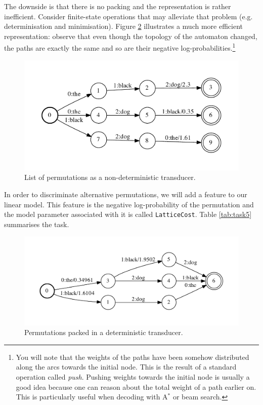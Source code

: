 The downside is that there is no packing and the representation is rather inefficient.
Consider finite-state operations that may alleviate that problem (e.g. determinisation and  minimisation). Figure \ref{fig:pi-det-min} illustrates a much more efficient representation: observe that even though the topology of the automaton changed, the paths are exactly the same and so are their negative log-probabilities.\footnote{You will note that the weights of the paths have been somehow distributed along the arcs towards the initial node. This is the result of a standard operation called \emph{push}. Pushing weights towards the initial node is usually a good idea because one can reason about the total weight of a path earlier on. This is particularly useful when decoding with A$^*$ or beam search.}

\begin{figure}[h]\centering
\includegraphics[scale=0.5]{permutations-list.pdf}
\caption{\label{fig:permutations}List of permutations as a non-deterministic transducer.}
\end{figure}


In order to discriminate alternative permutations, we will add a feature to our linear model. 
This feature is the negative log-probability of the permutation and the model parameter associated with it is called \texttt{LatticeCost}.
Table \ref{tab:task5} summarises the task. 

\begin{figure}[h]\centering
\includegraphics[scale=0.5]{permutations-lattice.pdf}
\caption{\label{fig:pi-det-min}Permutations packed in a deterministic transducer.}
\end{figure}

